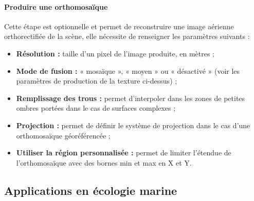 \paragraph{Produire une orthomosaïque}

Cette étape est optionnelle et permet de reconstruire une image aérienne orthorectifiée de la scène, elle nécessite de renseigner les paramètres suivants :

\begin{itemize}
    \item \textbf{Résolution :} taille d’un pixel de l’image produite, en mètres ;
    
    \item \textbf{Mode de fusion :} « mosaïque », « moyen » ou « désactivé » (voir les paramètres de production de la texture ci-dessus) ;
    
    \item \textbf{Remplissage des trous :} permet d’interpoler dans les zones de petites ombres portées dans le cas de surfaces complexes ;
    
    \item \textbf{Projection :} permet de définir le système de projection dans le cas d’une orthomosaïque géoréférencée ;
    
    \item \textbf{Utiliser la région personnalisée :} permet de limiter l’étendue de l’orthomosaïque avec des bornes min et max en X et Y.
\end{itemize}

\subsection{Applications en écologie marine}

